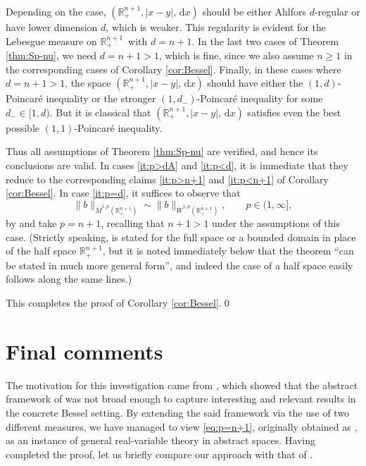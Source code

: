 \documentclass[reqno]{amsart}
\newcommand{\ud}[0]{\,\mathrm{d}}
\newcommand{\abs}[1]{|#1|}
\newcommand{\Norm}[2]{\|#1\|_{#2}}
\newcommand{\R}{\mathbb{R}}
\theoremstyle{plain}
\theoremstyle{definition}
\theoremstyle{remark}
\begin{document}
Depending on the case, $(\R_+^{n+1},\abs{x-y},\ud x)$ should be either Ahlfors $d$-regular or have lower dimension $d$, which is weaker. This regularity is evident for the Lebesgue measure on $\R_+^{n+1}$ with $d=n+1$. In the last two cases of Theorem \ref{thm:Sp-nu}, we need $d=n+1>1$, which is fine, since we also assume $n\geq 1$ in the corresponding cases of Corollary \ref{cor:Bessel}. Finally, in these cases where $d=n+1>1$, the space $(\R_+^{n+1},\abs{x-y},\ud x)$ should have either the $(1,d)$-Poincar\'e inequality or the stronger $(1,d_-)$-Poincar\'e inequality for some $d_-\in[1,d)$. But it is classical that $(\R_+^{n+1},\abs{x-y},\ud x)$ satisfies even the best possible $(1,1)$-Poincar\'e inequality.

Thus all assumptions of Theorem \ref{thm:Sp-nu} are verified, and hence its conclusions are valid. In cases \eqref{it:p>dA} and \eqref{it:p<d}, it is immediate that they reduce to the corresponding claims \eqref{it:p>n+1} and \eqref{it:p<n+1} of Corollary \ref{cor:Bessel}. In case \eqref{it:p=d}, it suffices to observe that
\begin{equation*}
  \Norm{b}{\dot M^{1,p}(\R_+^{n+1})}\sim
  \Norm{b}{\dot W^{1,p}(\R_+^{n+1})},\qquad p\in(1,\infty],
\end{equation*}
by \cite[Theorem 1]{Hajlasz:96} and take $p=n+1$, recalling that $n+1>1$ under the assumptions of this case. (Strictly speaking, \cite[Theorem 1]{Hajlasz:96} is stated for the full space or a bounded domain in place of the half space $\R_+^{n+1}$, but it is noted immediately below that the theorem ``can be stated in much more general form'', and indeed the case of a half space easily follows along the same lines.)

This completes the proof of Corollary \ref{cor:Bessel}.\qed

\section{Final comments}\label{sec:comments}

The motivation for this investigation came from \cite{FLSZ}, which showed that the abstract framework of \cite{Hyt:Sp} was not broad enough to capture interesting and relevant results in the concrete Bessel setting. By extending the said framework via the use of two different measures, we have managed to view \eqref{eq:p=n+1}, originally obtained as \cite[Theorem 1.2]{FLSZ}, as an instance of general real-variable theory in abstract spaces. Having completed the proof, let us briefly compare our approach with that of \cite{FLSZ}.
\end{document}
